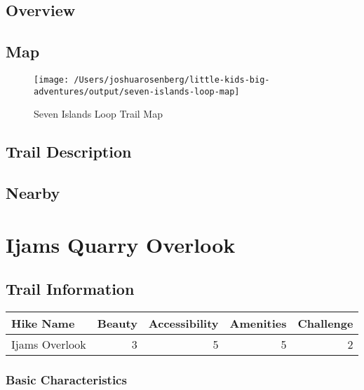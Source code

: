 \documentclass[
]{book}
\begin{document}
\hypertarget{overview}{%
\section{Overview}\label{overview}}

\hypertarget{map}{%
\section{Map}\label{map}}

\begin{figure}
\texttt{[image: /Users/joshuarosenberg/little-kids-big-adventures/output/seven-islands-loop-map]} \caption{Seven Islands Loop Trail Map}\label{fig:unnamed-chunk-9}
\end{figure}

\hypertarget{trail-description}{%
\section{Trail Description}\label{trail-description}}

\hypertarget{nearby}{%
\section{Nearby}\label{nearby}}

\hypertarget{ijams-quarry-overlook}{%
\chapter{Ijams Quarry Overlook}\label{ijams-quarry-overlook}}

\hypertarget{trail-information-1}{%
\section{Trail Information}\label{trail-information-1}}

\begin{tabular}{l|r|r|r|r}
\hline
Hike Name & Beauty & Accessibility & Amenities & Challenge\\
\hline
Ijams Overlook & 3 & 5 & 5 & 2\\
\hline
\end{tabular}

\hypertarget{basic-characteristics-1}{%
\subsection{Basic Characteristics}\label{basic-characteristics-1}}
\end{document}

